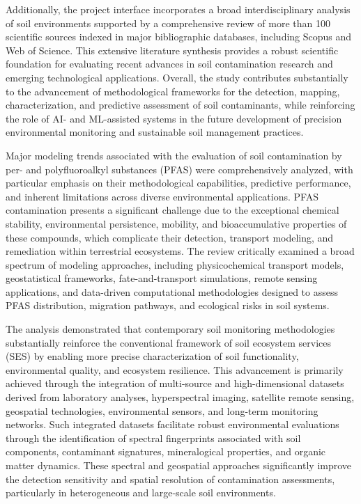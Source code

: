 \documentclass[sn-mathphys-num]{sn-jnl}
\begin{document}
Additionally, the project interface incorporates a broad interdisciplinary
analysis of soil environments supported by a comprehensive review of more than
100 scientific sources indexed in major bibliographic databases, including
Scopus and Web of Science. This extensive literature synthesis provides a
robust scientific foundation for evaluating recent advances in soil
contamination research and emerging technological applications. Overall, the
study contributes substantially to the advancement of methodological frameworks
for the detection, mapping, characterization, and predictive assessment of soil
contaminants, while reinforcing the role of AI- and ML-assisted systems in the
future development of precision environmental monitoring and sustainable soil
management practices.

Major modeling trends associated with the evaluation of soil contamination by
per- and polyfluoroalkyl substances (PFAS) were comprehensively analyzed, with
particular emphasis on their methodological capabilities, predictive
performance, and inherent limitations across diverse environmental
applications. PFAS contamination presents a significant challenge due to the
exceptional chemical stability, environmental persistence, mobility, and
bioaccumulative properties of these compounds, which complicate their
detection, transport modeling, and remediation within terrestrial ecosystems.
The review critically examined a broad spectrum of modeling approaches,
including physicochemical transport models, geostatistical frameworks,
fate-and-transport simulations, remote sensing applications, and data-driven
computational methodologies designed to assess PFAS distribution, migration
pathways, and ecological risks in soil systems.

The analysis demonstrated that contemporary soil monitoring methodologies
substantially reinforce the conventional framework of soil ecosystem services
(SES) by enabling more precise characterization of soil functionality,
environmental quality, and ecosystem resilience. This advancement is primarily
achieved through the integration of multi-source and high-dimensional datasets
derived from laboratory analyses, hyperspectral imaging, satellite remote
sensing, geospatial technologies, environmental sensors, and long-term
monitoring networks. Such integrated datasets facilitate robust environmental
evaluations through the identification of spectral fingerprints associated with
soil components, contaminant signatures, mineralogical properties, and organic
matter dynamics. These spectral and geospatial approaches significantly improve
the detection sensitivity and spatial resolution of contamination assessments,
particularly in heterogeneous and large-scale soil environments.
\end{document}
